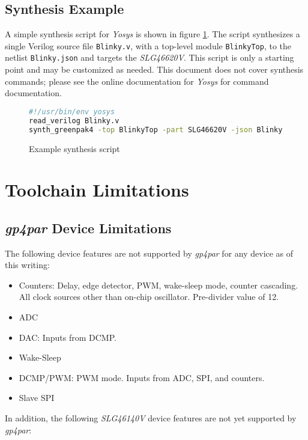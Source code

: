 \documentclass[11pt]{article}
\newcommand{\namestyle}[1]{\textit{#1}}
\begin{document}
\subsection{Synthesis Example}

A simple synthesis script for \namestyle{Yosys} is shown in figure \ref{yscript}. The script synthesizes a single
Verilog source file \texttt{Blinky.v}, with a top-level module \texttt{BlinkyTop}, to the netlist \texttt{Blinky.json}
and targets the \namestyle{SLG46620V}. This script is only a starting point and may be customized as needed. This
document does not cover synthesis commands; please see the online documentation for \namestyle{Yosys} for command
documentation.

\begin{figure}[h]
\begin{lstlisting}[language=sh]
#!/usr/bin/env yosys
read_verilog Blinky.v
synth_greenpak4 -top BlinkyTop -part SLG46620V -json Blinky.json
\end{lstlisting}
\caption{Example synthesis script}
\label{yscript}
\end{figure}

\pagebreak
\section{Toolchain Limitations}
\subsection{\namestyle{gp4par} Device Limitations}

The following device features are not supported by \namestyle{gp4par} for any device as of this writing:

\begin{itemize}
\item Counters: Delay, edge detector, PWM, wake-sleep mode, counter cascading.
All clock sources other than on-chip oscillator. Pre-divider value of 12.
\item ADC
\item DAC: Inputs from DCMP.
\item Wake-Sleep
\item DCMP/PWM: PWM mode. Inputs from ADC, SPI, and counters.
\item Slave SPI
\end{itemize}

In addition, the following \namestyle{SLG46140V} device features are not yet supported by \namestyle{gp4par}:
\end{document}
